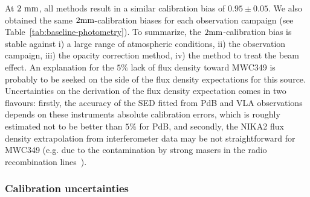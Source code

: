 At $2~\rm{mm}$, all methods result in a similar calibration bias
of $0.95 \pm 0.05$. We also obtained the same $2\rm{mm}$-calibration
biases for each observation campaign (see
Table~\ref{tab:baseline-photometry}). To summarize, the
$2\rm{mm}$-calibration bias is stable against i) a large range of
atmospheric conditions, ii) the observation campaign, iii) the
opacity correction method, iv) the method to treat the beam
effect. An explanation for the $5\%$ lack of flux density toward
MWC349 is probably to be seeked on the side of the flux density
expectations for this source. Uncertainties on the
derivation of the flux density expectation comes in two flavours:
firstly, the accuracy of the SED fitted from PdB and VLA observations
depends on these instruments absolute calibration errors, which is
roughly estimated not to be better than $5\%$ for PdB, and secondly,
the NIKA2 flux density extrapolation from
interferometer data may be not straightforward for MWC349 (e.g. due to
the contamination by strong masers in the radio recombination lines~\cite{masingRRL}).

\subsubsection{Calibration uncertainties}

